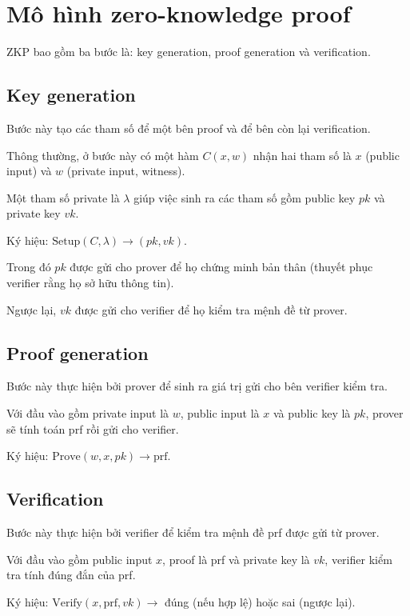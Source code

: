 \section{Mô hình zero-knowledge proof}

ZKP bao gồm ba bước là: key generation, proof generation và verification.

\subsection*{Key generation}

Bước này tạo các tham số để một bên proof và để bên còn lại verification.

Thông thường, ở bước này có một hàm $C(x, w)$ nhận hai tham số là $x$ (public input) và $w$ (private input, witness).

Một tham số private là $\lambda$ giúp việc sinh ra các tham số gồm public key $pk$ và private key $vk$.

Ký hiệu: $\text{Setup}(C, \lambda) \rightarrow (pk, vk)$.

Trong đó $pk$ được gửi cho prover để họ chứng minh bản thân (thuyết phục verifier rằng họ sở hữu thông tin).

Ngược lại, $vk$ được gửi cho verifier để họ kiểm tra mệnh đề từ prover.

\subsection*{Proof generation}

Bước này thực hiện bởi prover để sinh ra giá trị gửi cho bên verifier kiểm tra.

Với đầu vào gồm private input là $w$, public input là $x$ và public key là $pk$, prover sẽ tính toán prf rồi gửi cho verifier.

Ký hiệu: $\text{Prove}(w, x, pk) \rightarrow \text{prf}$.

\subsection*{Verification}

Bước này thực hiện bởi verifier để kiểm tra mệnh đề prf được gửi từ prover.

Với đầu vào gồm public input $x$, proof là prf và private key là $vk$, verifier kiểm tra tính đúng đắn của prf.

Ký hiệu: $\text{Verify}(x, \text{prf}, vk) \rightarrow$ đúng (nếu hợp lệ) hoặc sai (ngược lại).
